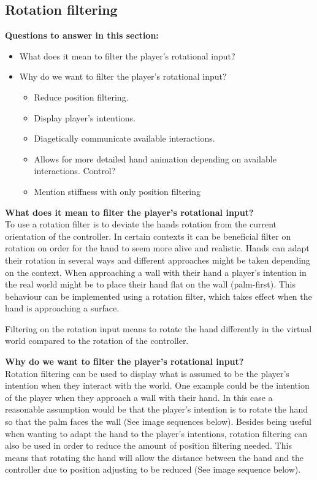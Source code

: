 \subsection{Rotation filtering}
\label{subsec:categoryRotationFiltering}
\textbf{Questions to answer in this section:}
\begin{itemize}
\item What does it mean to filter the player's rotational input?
\item Why do we want to filter the player's rotational input?
\begin{itemize}
\item Reduce position filtering.
\item Display player's intentions.
\item Diagetically communicate available interactions.
\item Allows for more detailed hand animation depending on available interactions. Control?
\item Mention stiffness with only position filtering
\end{itemize}
\end{itemize}

\textbf{What does it mean to filter the player's rotational input?}\\
To use a rotation filter is to deviate the hands rotation from the current orientation of the controller. In certain contexts it can be beneficial filter on rotation on order for the hand to seem more alive and realistic. Hands can adapt their rotation in several ways and different approaches might be taken depending on the context. When approaching a wall with their hand a player's intention in the real world might be to place their hand flat on the wall (palm-first). This behaviour can be implemented using a rotation filter, which takes effect when the hand is approaching a surface.


 Filtering on the rotation input means to rotate the hand differently in the virtual world compared to the rotation of the controller.

\textbf{Why do we want to filter the player's rotational input?}\\
Rotation filtering can be used to display what is assumed to be the player's intention when they interact with the world. One example could be the intention of the player when they approach a wall with their hand. In this case a reasonable assumption would be that the player's intention is to rotate the hand so that the palm faces the wall (See image sequences below). Besides being useful when wanting to adapt the hand to the player's intentions, rotation filtering can also be used in order to reduce the amount of position filtering needed. This means that rotating the hand will allow the distance between the hand and the controller due to position adjusting to be reduced (See image sequence below).

